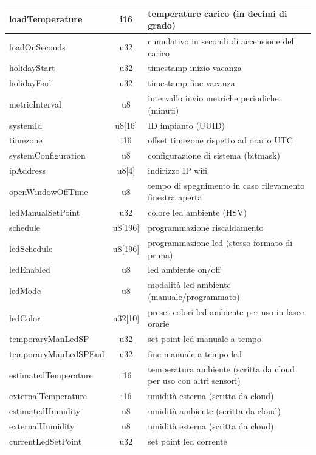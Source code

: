 \documentclass[12pt,a4paper,twoside,titlepage]{book}
\begin{document}
\begin{center}
\begin{longtable}{| p{5cm} | c | p{8cm} |}
    loadTemperature & i16 & temperature carico (in decimi di grado)\\ \hline
    loadOnSeconds & u32 & cumulativo in secondi di accensione del carico\\ \hline
    holidayStart & u32 & timestamp inizio vacanza\\ \hline
    holidayEnd & u32 & timestamp fine vacanza\\ \hline
    metricInterval & u8 & intervallo invio metriche periodiche (minuti)\\ \hline
    systemId & u8[16] & ID impianto (UUID)\\ \hline
    timezone & i16 & offset timezone rispetto ad orario UTC\\ \hline
    systemConfiguration & u8 & configurazione di sistema (bitmask)\\ \hline
    ipAddress & u8[4] & indirizzo IP \Gls{wifi}\\ \hline
    openWindowOffTime & u8 & tempo di spegnimento in caso rilevamento finestra aperta\\ \hline
    ledManualSetPoint & u32 & colore \acrshort{led} ambiente (HSV)\\ \hline
    schedule & u8[196] & programmazione riscaldamento\\ \hline
    ledSchedule & u8[196] & programmazione \acrshort{led} (stesso formato di prima)\\ \hline
    ledEnabled & u8 & \acrshort{led} ambiente on/off\\ \hline
    ledMode & u8 & modalità led ambiente (manuale/programmato)\\ \hline
    ledColor & u32[10] & preset colori \acrshort{led} ambiente per uso in fasce orarie\\ \hline
    temporaryManLedSP & u32 & set point \acrshort{led} manuale a tempo\\ \hline
    temporaryManLedSPEnd & u32 & fine manuale a tempo \acrshort{led}\\ \hline
    estimatedTemperature & i16 &temperatura ambiente (scritta da cloud per uso con altri sensori)\\ \hline
    externalTemperature & i16 & umidità esterna (scritta da cloud)\\ \hline
    estimatedHumidity & u8 & umidità ambiente (scritta da cloud)\\ \hline
    externalHumidity & u8 & umidità esterna (scritta da cloud)\\ \hline
    currentLedSetPoint & u32 & set point \acrshort{led} corrente\\ \hline

\end{longtable}
\end{center}
\end{document}
